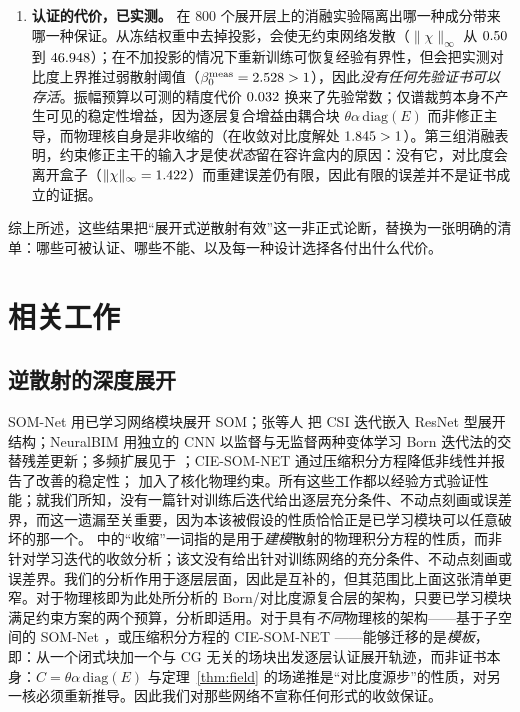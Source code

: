 \documentclass[UTF8,a4paper,11pt]{ctexart}
\newcommand{\infn}[1]{\lVert #1 \rVert_{\infty}}
\newcommand{\numv}[1]{#1}
\begin{document}
\begin{enumerate}
这些证书还在算子级上于公开的 Institut Fresnel 二维几何上被重新计算，并且也给出了基于实测 opus-2 体模、在没有训练修正权重情况下运行的重建，因为那些权重的直接迁移无法经受网格的改变而存活。

\item \textbf{认证的代价，已实测。} 在 $800$ 个展开层上的消融实验隔离出哪一种成分带来哪一种保证。从冻结权重中去掉投影，会使无约束网络发散（$\infn{\chi}$ 从 $\numv{\chimax}$ 到 $\numv{\NumFrzUncOffChi}$）；在不加投影的情况下重新训练可恢复经验有界性，但会把实测对比度上界推过弱散射阈值（$\beta_0^{\mathrm{meas}}=\numv{\NumBetaMeas}>1$），因此\emph{没有任何先验证书可以存活}。振幅预算以可测的精度代价 $\numv{\NumPriceDelta}$ 换来了先验常数；仅谱裁剪本身不产生可见的稳定性增益，因为逐层复合增益由耦合块 $\theta\alpha\,\mathrm{diag}(E)$ 而非修正主导，而物理核自身是非收缩的（在收敛对比度解处 $\numv{\NumPhysSigma}>1$）。第三组消融表明，约束修正主干的输入才是使\emph{状态}留在容许盒内的原因：没有它，对比度会离开盒子（$\infn{\chi}=\numv{\NumAblUncPOffFbOffChi}$）而重建误差仍有限，因此有限的误差并不是证书成立的证据。
\end{enumerate}
综上所述，这些结果把“展开式逆散射有效”这一非正式论断，替换为一张明确的清单：哪些可被认证、哪些不能、以及每一种设计选择各付出什么代价。

\section{相关工作}\label{sec:related}
\subsection{逆散射的深度展开}
SOM-Net \cite{somnet} 用已学习网络模块展开 SOM；张等人 \cite{unrolledcnn} 把 CSI 迭代嵌入 ResNet 型展开结构；NeuralBIM \cite{neuralbim} 用独立的 CNN 以监督与无监督两种变体学习 Born 迭代法的交替残差更新；多频扩展见于 \cite{mfneuralbim}；CIE-SOM-NET \cite{ciesomnet} 通过压缩积分方程降低非线性并报告了改善的稳定性；\cite{kernelunroll} 加入了核化物理约束。所有这些工作都以经验方式验证性能；就我们所知，没有一篇针对训练后迭代给出逐层充分条件、不动点刻画或误差界，而这一遗漏至关重要，因为本该被假设的性质恰恰正是已学习模块可以任意破坏的那一个。\cite{ciesomnet} 中的“收缩”一词指的是用于\emph{建模}散射的物理积分方程的性质，而非针对学习迭代的收敛分析；该文没有给出针对训练网络的充分条件、不动点刻画或误差界。我们的分析作用于逐层层面，因此是互补的，但其范围比上面这张清单更窄。对于物理核即为此处所分析的 Born/对比度源复合层的架构，只要已学习模块满足约束方案的两个预算，分析即适用。对于具有\emph{不同}物理核的架构——基于子空间的 SOM-Net \cite{somnet}，或压缩积分方程的 CIE-SOM-NET \cite{ciesomnet}——能够迁移的是\emph{模板}，即：从一个闭式块加一个与 CG 无关的场块出发逐层认证展开轨迹，而非证书本身：$C=\theta\alpha\,\mathrm{diag}(E)$ 与定理~\ref{thm:field} 的场递推是“对比度源步”的性质，对另一核必须重新推导。因此我们对那些网络不宣称任何形式的收敛保证。
\end{document}
